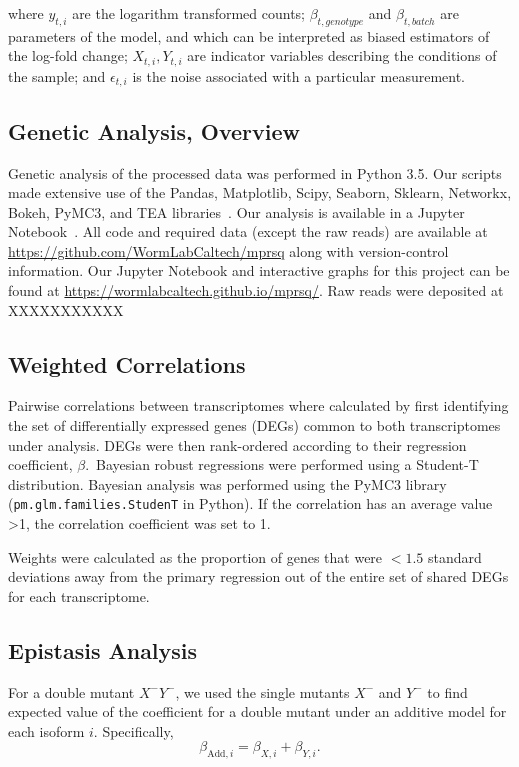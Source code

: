 \documentclass[9pt,twocolumn,twoside]{pnas-new}
\begin{document}
{where $y_{t, i}$ are the logarithm transformed counts; $\beta_{t, genotype}$ and
$\beta_{t, batch}$ are parameters of the model, and which can be interpreted as
biased estimators of the log-fold change; $X_{t, i}, Y_{t, i}$ are indicator
variables describing the conditions of the sample; and $\epsilon_{t, i}$ is the
noise associated with a particular measurement.

\subsection*{Genetic Analysis, Overview}
Genetic analysis of the processed data was performed in Python 3.5. Our scripts
made extensive use of the Pandas, Matplotlib, Scipy, Seaborn, Sklearn, Networkx,
Bokeh, PyMC3, and TEA libraries~\cite{Team2014,McKinney2011,Oliphant2007,
Pedregosa2012,Salvatier2015,VanDerWalt2011,Hunter2007,Angeles-Albores2016,Waskom}.
Our analysis is available in a Jupyter Notebook~\cite{Perez2007}. All code and
required data (except the raw reads) are available at
\url{https://github.com/WormLabCaltech/mprsq} along with version-control
information. Our Jupyter Notebook and interactive graphs for this project can be
found at \url{https://wormlabcaltech.github.io/mprsq/}. Raw reads were deposited
at XXXXXXXXXXX


\subsection*{Weighted Correlations}
Pairwise correlations between transcriptomes where calculated by first identifying
the set of differentially expressed genes (DEGs) common to both transcriptomes under
analysis. DEGs were then rank-ordered according to their regression coefficient,
$\beta$.\ Bayesian robust regressions were performed using a Student-T distribution.
Bayesian analysis was performed using the PyMC3 library~\cite{Salvatier2015}
(\texttt{pm.glm.families.StudenT} in Python). If the correlation has an average
value >1, the correlation coefficient was set to 1.

Weights were calculated as the proportion of genes that were $<1.5$ standard deviations
away from the primary regression out of the entire set of shared DEGs for each
transcriptome.

\subsection*{Epistasis Analysis}
For a double mutant $X^-Y^-$, we used the single mutants $X^-$ and $Y^-$ to
find expected value of the coefficient for a double mutant under an additive model
for each isoform $i$.
Specifically,
\begin{equation}
  \beta_{\mathrm{Add},i} = \beta_{X,i} + \beta_{Y,i}.
\end{equation}

}
\end{document}
